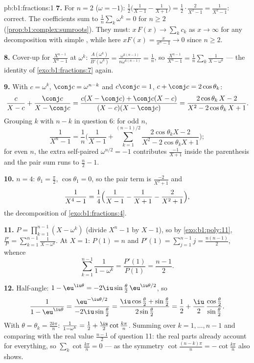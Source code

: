\begin{solution}{pb:b1:fractions:1}
\textbf{7.} For $n = 2$ ($\omega = -1$): $\frac12\bigl(
\frac1{X-1} - \frac1{X+1}\bigr) = \frac12\cdot\frac{2}{X^2-1} =
\frac1{X^2-1}$: correct. The coefficients sum to
$\frac1n\sum_k\omega^k = 0$ for $n \geq 2$
(\cref{prop:b1:complex:sumroots}). They must: $x\,F(x) \to
\sum_k c_k$ as $x \to \infty$ for any decomposition with simple
, while here $xF(x) = \frac{x}{x^n-1} \to 0$ since $n \geq
2$.

\textbf{8.} Cover-up for $\frac{X^{n-1}}{X^n - 1}$ at $\omega^k$:
$\frac{A(\omega^k)}{B'(\omega^k)} =
\frac{\omega^{k(n-1)}}{n\omega^{k(n-1)}} = \frac1n$, so
$\frac{X^{n-1}}{X^n-1} = \frac1n\sum_k\frac1{X - \omega^k}$ ---
the identity of \cref{exo:b1:fractions:7} again.

\textbf{9.} With $c = \omega^k$, $\conj c = \omega^{n-k}$ and
$c\conj c = 1$, $c + \conj c = 2\cos\theta_k$:
\[
\frac{c}{X - c} + \frac{\conj c}{X - \conj c}
= \frac{c(X - \conj c) + \conj c(X - c)}
{(X - c)(X - \conj c)}
= \frac{2\cos\theta_k\,X - 2}{X^2 - 2\cos\theta_k\,X + 1} .
\]
Grouping $k$ with $n - k$ in question 6: for odd $n$,
\[
\frac1{X^n - 1} = \frac1n\Biggl(\frac1{X-1} +
\sum_{k=1}^{(n-1)/2}
\frac{2\cos\theta_k X - 2}{X^2 - 2\cos\theta_k X + 1}\Biggr) ;
\]
for even $n$, the extra self-paired  $\omega^{n/2} = -1$
contributes $\frac{-1}{X+1}$ inside the parenthesis and the pair
sum runs to $\frac n2 - 1$.

\textbf{10.} $n = 4$: $\theta_1 = \frac\pi2$, $\cos\theta_1 = 0$,
so the pair term is $\frac{-2}{X^2+1}$ and
\[
\frac1{X^4-1} = \frac14\Bigl(\frac1{X-1} - \frac1{X+1}
- \frac2{X^2+1}\Bigr) ,
\]
the decomposition of \cref{exo:b1:fractions:4}.

\textbf{11.} $P = \prod_{k=1}^{n-1}(X - \omega^k)$ (divide $X^n -
1$ by $X - 1$), so by \cref{exo:b1:poly:11}, $\frac{P'}P =
\sum_{k=1}^{n-1}\frac1{X-\omega^k}$. At $X = 1$: $P(1) = n$ and
$P'(1) = \sum_{j=1}^{n-1}j = \frac{n(n-1)}2$, whence
\[
\sum_{k=1}^{n-1}\frac1{1 - \omega^k}
= \frac{P'(1)}{P(1)} = \frac{n-1}2 .
\]

\textbf{12.} Half-angle: $1 - \eu^{\iu\theta} =
-2\iu\sin\frac\theta2\,\eu^{\iu\theta/2}$, so
\[
\frac1{1 - \eu^{\iu\theta}}
= \frac{\eu^{-\iu\theta/2}}{-2\iu\sin\frac\theta2}
= \frac{\iu\cos\frac\theta2 + \sin\frac\theta2}
{2\sin\frac\theta2}
= \frac12 + \frac\iu2\,
\frac{\cos\frac\theta2}{\sin\frac\theta2} .
\]
With $\theta = \theta_k = \frac{2k\pi}n$: $\frac1{1-\omega^k} =
\frac12 + \frac\iu2\cot\frac{k\pi}n$. Summing over $k = 1, \dots,
n-1$ and comparing with the real value $\frac{n-1}2$ of
question 11: the real parts already account for everything, so
$\sum_k\cot\frac{k\pi}n = 0$ --- as the symmetry $\cot\frac{(n-k)
\pi}n = -\cot\frac{k\pi}n$ also shows.


\end{solution}
